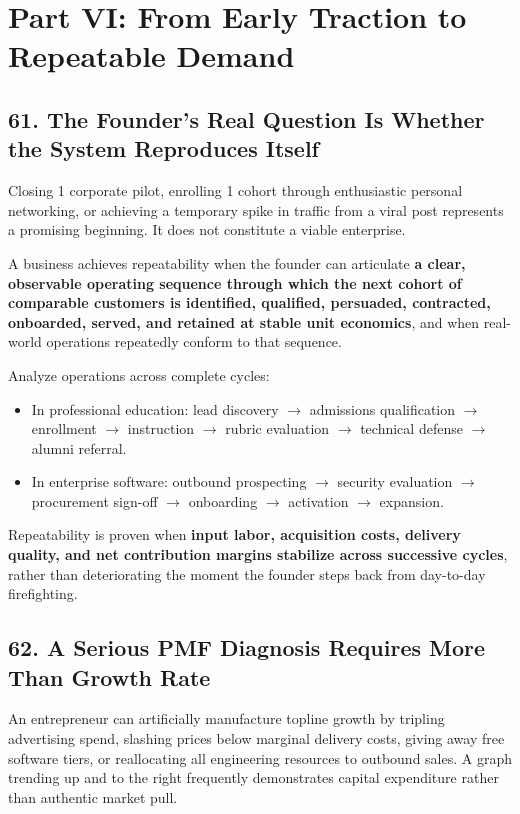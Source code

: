\section*{Part VI: From Early Traction to Repeatable Demand}

\subsection*{61. The Founder's Real Question Is Whether the System Reproduces Itself}

Closing 1 corporate pilot, enrolling 1 cohort through enthusiastic personal networking, or achieving a temporary spike in traffic from a viral post represents a promising beginning. It does not constitute a viable enterprise.

A business achieves repeatability when the founder can articulate \textbf{a clear, observable operating sequence through which the next cohort of comparable customers is identified, qualified, persuaded, contracted, onboarded, served, and retained at stable unit economics}, and when real-world operations repeatedly conform to that sequence.

Analyze operations across complete cycles:
\begin{itemize}
    \item In professional education: lead discovery $\rightarrow$ admissions qualification $\rightarrow$ enrollment $\rightarrow$ instruction $\rightarrow$ rubric evaluation $\rightarrow$ technical defense $\rightarrow$ alumni referral.
    \item In enterprise software: outbound prospecting $\rightarrow$ security evaluation $\rightarrow$ procurement sign-off $\rightarrow$ onboarding $\rightarrow$ activation $\rightarrow$ expansion.
\end{itemize}

Repeatability is proven when \textbf{input labor, acquisition costs, delivery quality, and net contribution margins stabilize across successive cycles}, rather than deteriorating the moment the founder steps back from day-to-day firefighting.

\subsection*{62. A Serious PMF Diagnosis Requires More Than Growth Rate}

An entrepreneur can artificially manufacture topline growth by tripling advertising spend, slashing prices below marginal delivery costs, giving away free software tiers, or reallocating all engineering resources to outbound sales. A graph trending up and to the right frequently demonstrates capital expenditure rather than authentic market pull.

